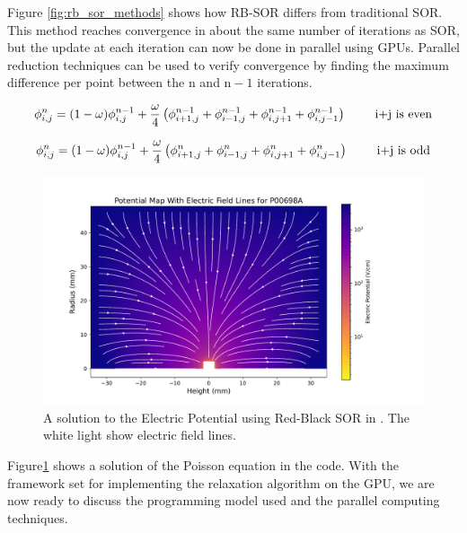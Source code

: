 Figure \ref{fig:rb_sor_methods} shows how RB-SOR differs from traditional SOR. This method reaches convergence in about the same number of iterations as SOR, but the update at each iteration can now be done in parallel using GPUs. Parallel reduction techniques can be used to verify convergence by finding the maximum difference per point between the $\text{n}$ and $\text{n}-1$ iterations. 

\begin{equation}{\label{rb_e}}
 \phi_{i,j}^{n} = (1-\omega)\phi^{n-1}_{i,j} + \frac{\omega}{4} \left(\phi^{n-1}_{i+1,j} + \phi^{n-1}_{i-1,j} + \phi^{n-1}_{i,j+1} + \phi^{n-1}_{i,j-1} \right) \qquad \text{ i+j is even}
\end{equation}

\begin{equation}{\label{rb_o}}
 \phi_{i,j}^{n} = (1-\omega)\phi^{n-1}_{i,j} + \frac{\omega}{4} \left(\phi^{n}_{i+1,j} + \phi^n_{i-1,j} + \phi^{n}_{i,j+1} + \phi^n_{i,j-1} \right) \qquad \text{ i+j is odd}
\end{equation}

\begin{figure}[!htb]
\centering
 \includegraphics[width=\linewidth]{ch4/figs/elect_pot_P00698A.pdf}
\caption{\label{fig:sor_pot_sol} A solution to the Electric Potential using Red-Black SOR in {\ehd}. The white light show electric field lines.}
\label{ch4:fig:elect_pot_soln}
\end{figure}

Figure\ref{ch4:fig:elect_pot_soln} shows a solution of the Poisson equation in the code. With the framework set for implementing the relaxation algorithm on the GPU, we are now ready to discuss the programming model used and the parallel computing techniques.


